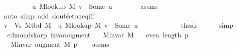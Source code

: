 \begin{isabellebody}
\ \ \ \ \isamarkupfalse%
\ \isamarkupfalse%
\ {\isachardoublequoteopen}{\isachardot}{\kern0pt}{\isachardot}{\kern0pt}{\isachardot}{\kern0pt}\ {\isasymlongleftrightarrow}\ {\isacharparenleft}{\kern0pt}{\isasymexists}u{\isachardot}{\kern0pt}\ M{\isacharunderscore}{\kern0pt}lookup\ M\ v\ {\isacharequal}{\kern0pt}\ Some\ u{\isacharparenright}{\kern0pt}{\isachardoublequoteclose}\isanewline
\ \ \ \ \ \ \isamarkupfalse%
\ assms\isanewline
\ \ \ \ \ \ \isamarkupfalse%
\ {\isacharparenleft}{\kern0pt}auto\ simp\ add{\isacharcolon}{\kern0pt}\ doubleton{\isacharunderscore}{\kern0pt}eq{\isacharunderscore}{\kern0pt}iff{\isacharparenright}{\kern0pt}\isanewline
\ \ \ \ \isamarkupfalse%
\ \isamarkupfalse%
\ {\isachardoublequoteopen}v\ {\isasymin}\ Vs\ {\isacharparenleft}{\kern0pt}M{\isacharunderscore}{\kern0pt}tbd\ M{\isacharparenright}{\kern0pt}\ {\isasymlongleftrightarrow}\ {\isacharparenleft}{\kern0pt}{\isasymexists}u{\isachardot}{\kern0pt}\ M{\isacharunderscore}{\kern0pt}lookup\ M\ v\ {\isacharequal}{\kern0pt}\ Some\ u{\isacharparenright}{\kern0pt}{\isachardoublequoteclose}\isanewline
\ \ \ \ \ \ \isacommand{{\isachardot}{\kern0pt}}\isamarkupfalse%
\ \isacommand{{\isacharbraceright}{\kern0pt}}\isamarkupfalse%
\isanewline
\ \ \isamarkupfalse%
\ {\isacharquery}{\kern0pt}thesis\isanewline
\ \ \ \ \isamarkupfalse%
\ simp\isanewline
{}\isamarkupfalse%
%
\endisatagproof
{\isafoldproof}%
%
\isadelimproof
\isanewline
%
\endisadelimproof
%
\isadeliminvisible
\isanewline
%
\endisadeliminvisible
%
\isataginvisible
{}\isamarkupfalse%
\ {\isacharparenleft}{\kern0pt}\ edmonds{\isacharunderscore}{\kern0pt}karp{\isacharparenright}{\kern0pt}\ invar{\isacharunderscore}{\kern0pt}augment{\isacharcolon}{\kern0pt}\isanewline
\ \ \ {\isachardoublequoteopen}M{\isachardot}{\kern0pt}invar\ M{\isachardoublequoteclose}\isanewline
\ \ \ {\isachardoublequoteopen}even\ {\isacharparenleft}{\kern0pt}length\ p{\isacharparenright}{\kern0pt}{\isachardoublequoteclose}\isanewline
\ \ \ {\isachardoublequoteopen}M{\isachardot}{\kern0pt}invar\ {\isacharparenleft}{\kern0pt}augment\ M\ p{\isacharparenright}{\kern0pt}{\isachardoublequoteclose}%
\endisataginvisible
{\isafoldinvisible}%
%
\isadeliminvisible
\isanewline
%
\endisadeliminvisible
%
\isadelimproof
\ \ %
\endisadelimproof
%
\isatagproof
{}\isamarkupfalse%
\ assms\isanewline
{}\isamarkupfalse%

\end{isabellebody}
